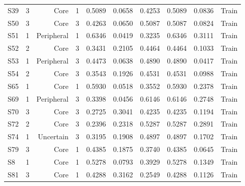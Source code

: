 {\begin{longtable}{lrrrrrrrrr}
  S39 & 3 & Core & 1 & 0.5089 & 0.0658 & 0.4253 & 0.5089 & 0.0836 & Train \\
  S50 & 3 & Core & 3 & 0.4263 & 0.0650 & 0.5087 & 0.5087 & 0.0824 & Train \\
  S51 & 1 & Peripheral & 1 & 0.6346 & 0.0419 & 0.3235 & 0.6346 & 0.3111 & Train \\
  S52 & 2 & Core & 3 & 0.3431 & 0.2105 & 0.4464 & 0.4464 & 0.1033 & Train \\
  S53 & 1 & Peripheral & 3 & 0.4473 & 0.0638 & 0.4890 & 0.4890 & 0.0417 & Train \\
  S54 & 2 & Core & 3 & 0.3543 & 0.1926 & 0.4531 & 0.4531 & 0.0988 & Train \\
  S65 & 1 & Core & 1 & 0.5930 & 0.0518 & 0.3552 & 0.5930 & 0.2378 & Train \\
  S69 & 1 & Peripheral & 3 & 0.3398 & 0.0456 & 0.6146 & 0.6146 & 0.2748 & Train \\
  S70 & 3 & Core & 3 & 0.2725 & 0.3041 & 0.4235 & 0.4235 & 0.1194 & Train \\
  S72 & 2 & Core & 3 & 0.2396 & 0.2318 & 0.5287 & 0.5287 & 0.2891 & Train \\
  S74 & 1 & Uncertain & 3 & 0.3195 & 0.1908 & 0.4897 & 0.4897 & 0.1702 & Train \\
  S79 & 3 & Core & 1 & 0.4385 & 0.1875 & 0.3740 & 0.4385 & 0.0645 & Train \\
  S8 & 1 & Core & 1 & 0.5278 & 0.0793 & 0.3929 & 0.5278 & 0.1349 & Train \\
  S81 & 3 & Core & 1 & 0.4288 & 0.3162 & 0.2549 & 0.4288 & 0.1126 & Train \\
\end{longtable}
}
